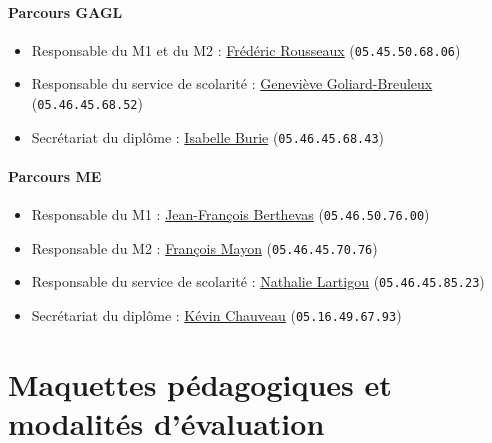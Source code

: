 \documentclass[a4paper,11pt]{article}
\begin{document}
\paragraph{Parcours GAGL}

\begin{itemize}
	\item Responsable du M1 et du M2 : \href{mailto:frederic.rousseaux@univ-lr.fr}{Frédéric Rousseaux} (\texttt{05.45.50.68.06})
	\item Responsable du service de scolarité : \href{mailto:genevieve.breuleux@univ-lr.fr}{Geneviève Goliard-Breuleux} (\texttt{05.46.45.68.52})
	\item Secrétariat du diplôme : \href{mailto:isabelle.burie@univ-lr.fr}{Isabelle Burie} (\texttt{05.46.45.68.43})
\end{itemize}

\paragraph{Parcours ME}

\begin{itemize}
	\item Responsable du M1 : \href{mailto:jean-francois.berthevas@univ-lr.fr}{Jean-François Berthevas} (\texttt{05.46.50.76.00})
	\item Responsable du M2 : \href{mailto:francois.mayon@univ-lr.fr}{François Mayon} (\texttt{05.46.45.70.76})
	\item Responsable du service de scolarité : \href{mailto:nathalie.lartigou}{Nathalie Lartigou} (\texttt{05.46.45.85.23})
	\item Secrétariat du diplôme : \href{mailto:kevin.chauveau}{Kévin Chauveau} (\texttt{05.16.49.67.93})
\end{itemize}

\newpage

\section{Maquettes pédagogiques et modalités d'évaluation}\label{Maquette}
\end{document}

